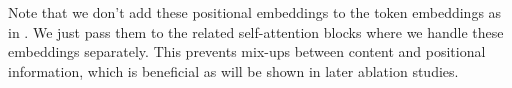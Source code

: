 Note that we don't add these positional embeddings to the token embeddings as in \cite{BERT, BERT4Rec}. We just pass them to the related self-attention blocks where we handle these embeddings separately. This prevents mix-ups between content and positional information, which is beneficial as will be shown in later ablation studies.
